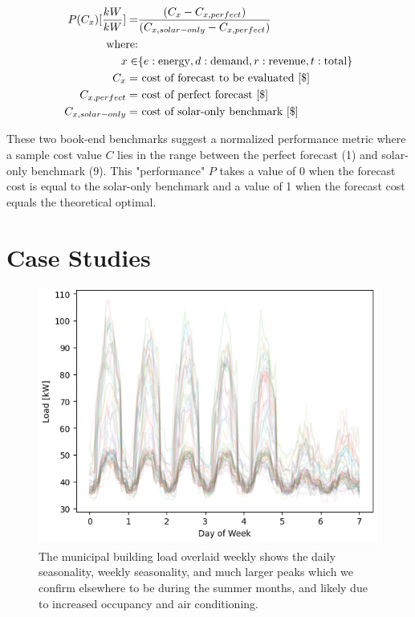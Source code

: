 \documentclass[conference]{IEEEtran}
\begin{document}
\begin{align}
    P(C_x) [\frac{kW}{kW}]= & (C_x - C_{x,perfect}) \over (C_{x,solar-only} - C_{x,perfect}) \label{eq:performance} \\
    \text{where:}& \notag \\
    x  \in & \{e:\text{energy},d:\text{demand},r:\text{revenue},t:\text{total} \}  \notag \\
    C_x =& \text{ cost of forecast to be evaluated [\$]}  \notag \\
    C_{x,perfect} =& \text{ cost of perfect forecast [\$]}  \notag \\
    C_{x,solar-only} =& \text{ cost of solar-only benchmark [\$]}  \notag 
\end{align} 

These two book-end benchmarks suggest a normalized performance metric where a sample cost value $C$ lies in the range between the perfect forecast (1) and solar-only benchmark (9). This "performance" $P$ takes a value of 0 when the forecast cost is equal to the solar-only benchmark and a value of 1 when the forecast cost equals the theoretical optimal.

\section{Case Studies}

\begin{figure}
    \centering
    \includegraphics[width=0.95\linewidth]{weekly.png}
    \caption{The municipal building load overlaid weekly shows the daily seasonality, weekly seasonality, and much larger peaks which we confirm elsewhere to be during the summer months, and likely due to increased occupancy and air conditioning. }
    \label{fig:data-weekly}
\end{figure}
\end{document}
